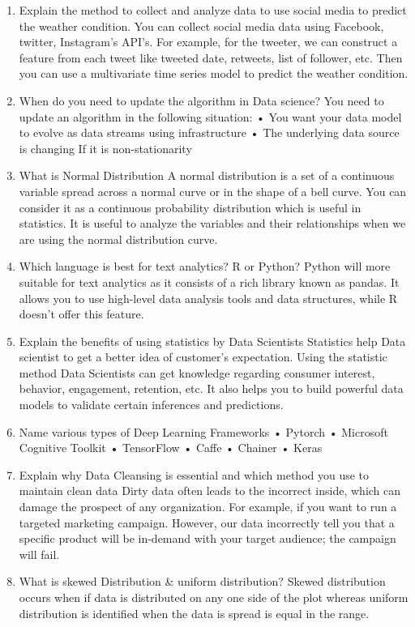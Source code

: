 \documentclass[
]{book}
\begin{document}
\begin{enumerate}
\item
  Explain the method to collect and analyze data to use social media to predict the weather condition.
  You can collect social media data using Facebook, twitter, Instagram's API's. For example, for the tweeter, we can construct a feature from each tweet like tweeted date, retweets, list of follower, etc. Then you can use a multivariate time series model to predict the weather condition.
\item
  When do you need to update the algorithm in Data science?
  You need to update an algorithm in the following situation:
  • You want your data model to evolve as data streams using infrastructure
  • The underlying data source is changing If it is non-stationarity
\item
  What is Normal Distribution
  A normal distribution is a set of a continuous variable spread across a normal curve or in the shape of a bell curve. You can consider it as a continuous probability distribution which is useful in statistics. It is useful to analyze the variables and their relationships when we are using the normal distribution curve.
\item
  Which language is best for text analytics? R or Python?
  Python will more suitable for text analytics as it consists of a rich library known as pandas. It allows you to use high-level data analysis tools and data structures, while R doesn't offer this feature.
\item
  Explain the benefits of using statistics by Data Scientists
  Statistics help Data scientist to get a better idea of customer's expectation. Using the statistic method Data Scientists can get knowledge regarding consumer interest, behavior, engagement, retention, etc. It also helps you to build powerful data models to validate certain inferences and predictions.
\item
  Name various types of Deep Learning Frameworks
  • Pytorch
  • Microsoft Cognitive Toolkit
  • TensorFlow
  • Caffe
  • Chainer
  • Keras
\item
  Explain why Data Cleansing is essential and which method you use to maintain clean data
  Dirty data often leads to the incorrect inside, which can damage the prospect of any organization. For example, if you want to run a targeted marketing campaign. However, our data incorrectly tell you that a specific product will be in-demand with your target audience; the campaign will fail.
\item
  What is skewed Distribution \& uniform distribution?
  Skewed distribution occurs when if data is distributed on any one side of the plot whereas uniform distribution is identified when the data is spread is equal in the range.

\end{enumerate}
\end{document}
